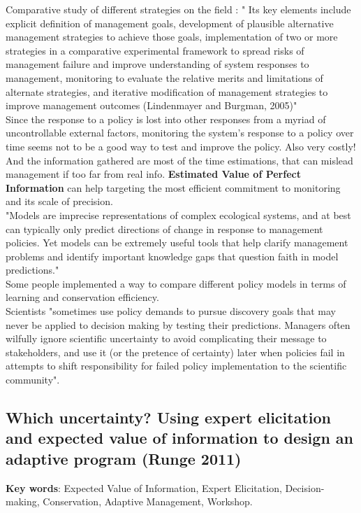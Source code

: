 \documentclass[12pt]{article}
\begin{document}
Comparative study of different strategies on the field : " Its key elements include explicit
definition of management goals, development of plausible alternative management strategies to achieve those goals, implementation of two or more strategies in a comparative experimental
framework to spread risks of management failure and improve
understanding of system responses to management, monitoring
to evaluate the relative merits and limitations of alternate strategies, and iterative modification of management strategies to improve management outcomes (Lindenmayer and Burgman, 2005)"\\
Since the response to a policy is lost into other responses from a myriad of uncontrollable external factors, monitoring the system's response to a policy over time seems not to be a good way to test and improve the policy. Also very costly! And the information gathered are most of the time estimations, that can mislead management if too far from real info. \textbf{Estimated Value of Perfect Information} can help targeting the most efficient commitment to monitoring and its scale of precision.\\
"Models are imprecise representations of complex ecological
systems, and at best can typically only predict directions of change
in response to management policies. Yet models can be extremely
useful tools that help clarify management problems and identify
important knowledge gaps that question faith in model predictions."\\
Some people implemented a way to compare different policy models in terms of learning and conservation efficiency.\\
Scientists "sometimes use policy
demands to pursue discovery goals that may never be applied to
decision making by testing their predictions. Managers often wilfully ignore scientific uncertainty to avoid complicating their message to stakeholders, and use it (or the pretence of certainty) later
when policies fail in attempts to shift responsibility for failed policy implementation to the scientific community".

\subsection{Which uncertainty? Using expert elicitation and expected value of information to design an adaptive program (Runge 2011)}
\textbf{Key words}: Expected Value of Information, Expert Elicitation, Decision-making, Conservation, Adaptive Management, Workshop.\\
\end{document}
